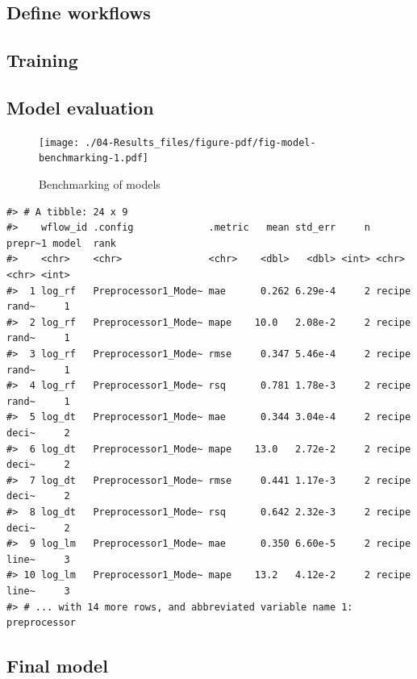 \documentclass[
  letterpaper,
  DIV=11,
  numbers=noendperiod]{scrreprt}
\begin{document}
\hypertarget{define-workflows}{%
\subsection{Define workflows}\label{define-workflows}}

\hypertarget{training}{%
\subsection{Training}\label{training}}

\hypertarget{sec-model-evaluation}{%
\subsection{Model evaluation}\label{sec-model-evaluation}}

\begin{figure}

{\centering \texttt{[image: ./04-Results\_files/figure-pdf/fig-model-benchmarking-1.pdf]}

}

\caption{\label{fig-model-benchmarking}Benchmarking of models}

\end{figure}

\begin{verbatim}
#> # A tibble: 24 x 9
#>    wflow_id .config             .metric   mean std_err     n prepr~1 model  rank
#>    <chr>    <chr>               <chr>    <dbl>   <dbl> <int> <chr>   <chr> <int>
#>  1 log_rf   Preprocessor1_Mode~ mae      0.262 6.29e-4     2 recipe  rand~     1
#>  2 log_rf   Preprocessor1_Mode~ mape    10.0   2.08e-2     2 recipe  rand~     1
#>  3 log_rf   Preprocessor1_Mode~ rmse     0.347 5.46e-4     2 recipe  rand~     1
#>  4 log_rf   Preprocessor1_Mode~ rsq      0.781 1.78e-3     2 recipe  rand~     1
#>  5 log_dt   Preprocessor1_Mode~ mae      0.344 3.04e-4     2 recipe  deci~     2
#>  6 log_dt   Preprocessor1_Mode~ mape    13.0   2.72e-2     2 recipe  deci~     2
#>  7 log_dt   Preprocessor1_Mode~ rmse     0.441 1.17e-3     2 recipe  deci~     2
#>  8 log_dt   Preprocessor1_Mode~ rsq      0.642 2.32e-3     2 recipe  deci~     2
#>  9 log_lm   Preprocessor1_Mode~ mae      0.350 6.60e-5     2 recipe  line~     3
#> 10 log_lm   Preprocessor1_Mode~ mape    13.2   4.12e-2     2 recipe  line~     3
#> # ... with 14 more rows, and abbreviated variable name 1: preprocessor
\end{verbatim}

\hypertarget{sec-final-model}{%
\subsection{Final model}\label{sec-final-model}}
\end{document}
